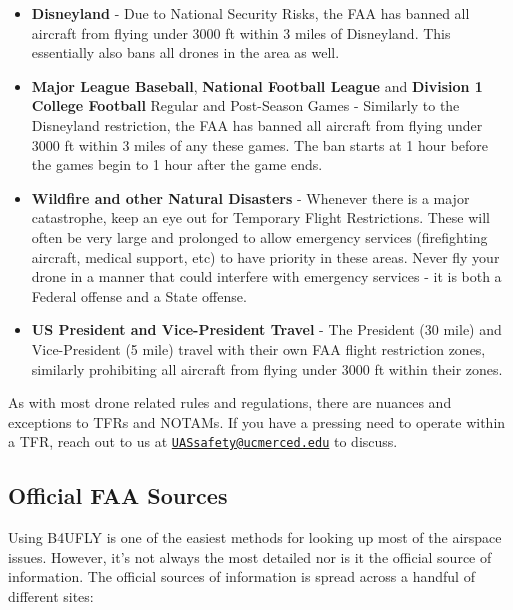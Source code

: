 \documentclass[
  12pt,
]{book}
\providecommand{\tightlist}{%
  \setlength{\itemsep}{0pt}\setlength{\parskip}{0pt}}
\newenvironment{notebox}{
  \definecolor{shadecolor}{gray}{.8}  %
  \color{black}
  \begin{shaded}}
 {\end{shaded}}
\begin{document}
\begin{itemize}
\tightlist
\item
  \textbf{Disneyland} - Due to National Security Risks, the FAA has banned all aircraft from flying under 3000 ft within 3 miles of Disneyland. This essentially also bans all drones in the area as well.\\
\item
  \textbf{Major League Baseball}, \textbf{National Football League} and \textbf{Division 1 College Football} Regular and Post-Season Games - Similarly to the Disneyland restriction, the FAA has banned all aircraft from flying under 3000 ft within 3 miles of any these games. The ban starts at 1 hour before the games begin to 1 hour after the game ends.\\
\item
  \textbf{Wildfire and other Natural Disasters} - Whenever there is a major catastrophe, keep an eye out for Temporary Flight Restrictions. These will often be very large and prolonged to allow emergency services (firefighting aircraft, medical support, etc) to have priority in these areas. Never fly your drone in a manner that could interfere with emergency services - it is both a Federal offense and a State offense.\\
\item
  \textbf{US President and Vice-President Travel} - The President (30 mile) and Vice-President (5 mile) travel with their own FAA flight restriction zones, similarly prohibiting all aircraft from flying under 3000 ft within their zones.
\end{itemize}

\begin{notebox}
As with most drone related rules and regulations, there are nuances and exceptions to TFRs and NOTAMs. If you have a pressing need to operate within a TFR, reach out to us at \href{mailto:UASsafety@ucmerced.edu}{\nolinkurl{UASsafety@ucmerced.edu}} to discuss.

\end{notebox}

\hypertarget{official-faa-sources}{%
\subsection{Official FAA Sources}\label{official-faa-sources}}

Using B4UFLY is one of the easiest methods for looking up most of the airspace issues. However, it's not always the most detailed nor is it the official source of information. The official sources of information is spread across a handful of different sites:
\end{document}
